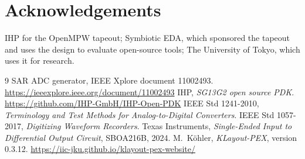 \documentclass[10pt,a4paper]{article}
\begin{document}
\section*{Acknowledgements}
IHP for the OpenMPW tapeout; Symbiotic EDA, which sponsored the tapeout and uses the design to evaluate
open-source tools; The University of Tokyo, which uses it for research.

\begin{thebibliography}{9}
 SAR ADC generator, IEEE Xplore document 11002493.
  \url{https://ieeexplore.ieee.org/document/11002493}
 IHP, \emph{SG13G2 open source PDK}. \url{https://github.com/IHP-GmbH/IHP-Open-PDK}
 IEEE Std 1241-2010, \emph{Terminology and Test Methods for Analog-to-Digital Converters}.
 IEEE Std 1057-2017, \emph{Digitizing Waveform Recorders}.
 Texas Instruments, \emph{Single-Ended Input to Differential Output Circuit}, SBOA216B, 2024.
 M.~K\"ohler, \emph{KLayout-PEX}, version 0.3.12. \url{https://iic-jku.github.io/klayout-pex-website/}
\end{thebibliography}
\end{document}
